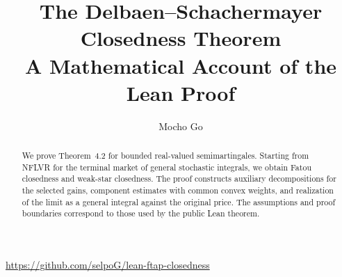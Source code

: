 \documentclass[11pt,a4paper]{article}
\title{The Delbaen--Schachermayer Closedness Theorem\\A Mathematical Account of the Lean Proof}
\author{Mocho Go}
\date{}
\theoremstyle{definition}
\begin{document}
\maketitle
\begin{center}
\url{https://github.com/selpoG/lean-ftap-closedness}
\end{center}
\setcounter{tocdepth}{2}
\begin{abstract}
We prove Theorem~4.2 for bounded real-valued semimartingales.
Starting from NFLVR for the terminal market of general stochastic integrals,
we obtain Fatou closedness and weak-star closedness. The proof constructs
auxiliary decompositions for the selected gains, component estimates with
common convex weights, and realization of the limit as a general integral
against the original price. The assumptions and proof boundaries correspond
to those used by the public Lean theorem.
\end{abstract}
\tableofcontents









\appendix

\clearpage


\end{document}
